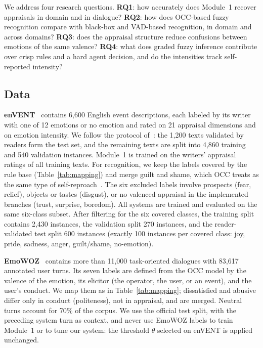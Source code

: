 \documentclass[conference, a4paper]{IEEEtran}
\begin{document}
We address four research questions. \textbf{RQ1}: how accurately does Module~1 recover appraisals in domain and in dialogue? \textbf{RQ2}: how does OCC-based fuzzy recognition compare with black-box and VAD-based recognition, in domain and across domains? \textbf{RQ3}: does the appraisal structure reduce confusions between emotions of the same valence? \textbf{RQ4}: what does graded fuzzy inference contribute over crisp rules and a hard agent decision, and do the intensities track self-reported intensity?

\subsection{Data}
\textbf{enVENT}~\cite{troiano2023dimensional} contains 6,600 English event descriptions, each labeled by its writer with one of 12 emotions or no emotion and rated on 21 appraisal dimensions and on emotion intensity. We follow the protocol of~\cite{troiano2023dimensional}: the 1,200 texts validated by readers form the test set, and the remaining texts are split into 4,860 training and 540 validation instances. Module~1 is trained on the writers' appraisal ratings of all training texts. For recognition, we keep the labels covered by the rule base (Table~\ref{tab:mapping}) and merge guilt and shame, which OCC treats as the same type of self-reproach~\cite{ortony1988cognitive}. The six excluded labels involve prospects (fear, relief), objects or tastes (disgust), or no valenced appraisal in the implemented branches (trust, surprise, boredom). All systems are trained and evaluated on the same six-class subset. After filtering for the six covered classes, the training split contains 2,430 instances, the validation split 270 instances, and the reader-validated test split 600 instances (exactly 100 instances per covered class: joy, pride, sadness, anger, guilt/shame, no-emotion).

\textbf{EmoWOZ}~\cite{feng2022emowoz} contains more than 11,000 task-oriented dialogues with 83,617 annotated user turns. Its seven labels are defined from the OCC model by the valence of the emotion, its elicitor (the operator, the user, or an event), and the user's conduct. We map them as in Table~\ref{tab:mapping}; dissatisfied and abusive differ only in conduct (politeness), not in appraisal, and are merged. Neutral turns account for 70\% of the corpus. We use the official test split, with the preceding system turn as context, and never use EmoWOZ labels to train Module~1 or to tune our system: the threshold $\theta$ selected on enVENT is applied unchanged.
\end{document}
